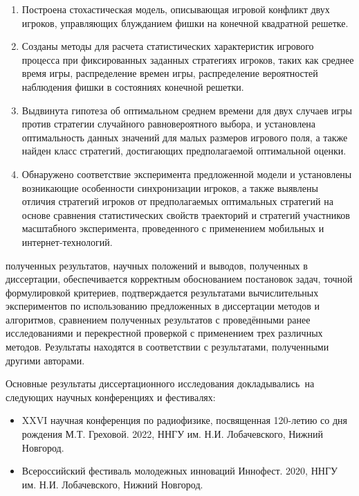 {}
\begin{enumerate}[beginpenalty=10000] %
  \item Построена стохастическая модель, описывающая игровой конфликт двух игроков, управляющих блужданием фишки на конечной квадратной решетке.
  \item Созданы методы для расчета статистических характеристик игрового процесса при фиксированных заданных стратегиях игроков,
        таких как среднее время игры, распределение времен игры, распределение вероятностей наблюдения фишки в состояниях конечной решетки. 
  \item Выдвинута гипотеза об оптимальном среднем времени для двух случаев игры против стратегии случайного равновероятного выбора,
        и установлена оптимальность данных значений для малых размеров игрового поля, а также найден класс стратегий, достигающих предполагаемой оптимальной оценки.
  \item Обнаружено соответствие эксперимента предложенной модели и установлены возникающие особенности синхронизации игроков, 
        а также выявлены отличия стратегий игроков от предполагаемых оптимальных стратегий
        на основе сравнения статистических свойств траекторий и стратегий участников масштабного эксперимента, 
        проведенного с применением мобильных и интернет-технологий.
  
\end{enumerate}

{\reliability} полученных результатов, научных положений и выводов,
полученных в диссертации, обеспечивается корректным обоснованием
постановок задач, точной формулировкой критериев, подтверждается результатами
вычислительных экспериментов по использованию предложенных в
диссертации методов и алгоритмов, сравнением полученных результатов с
проведёнными ранее исследованиями и перекрестной проверкой с применением трех различных методов.
Результаты находятся в соответствии с результатами, полученными другими авторами.

{\probation}
Основные результаты диссертационного исследования докладывались~на следующих научных конференциях и фестивалях:
\begin{itemize}
    \item XXVI научная конференция по радиофизике, посвященная 120-летию со дня рождения М.Т. Греховой. 2022, ННГУ им. Н.И. Лобачевского,
    Нижний Новгород.
    \item Всероссийский фестиваль молодежных инноваций Иннофест. 2020, ННГУ им. Н.И. Лобачевского,
    Нижний Новгород.
\end{itemize}


